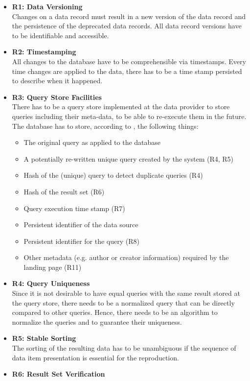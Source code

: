 \documentclass[draft,final]{vutinfth} %
\begin{document}
\begin{itemize}
	\item \textbf{R1: Data Versioning} \\
	Changes on a data record must result in a new version of the data record and the persistence of the deprecated data records. All data record versions have to be identifiable and accessible. 
	\item \textbf{R2: Timestamping} \\
	All changes to the database have to be comprehensible via timestamps. Every time changes are applied to the data, there has to be a time stamp persisted to describe when it happened. 
	\item \textbf{R3: Query Store Facilities} \\
	There has to be a query store implemented at the data provider to store queries including their meta-data, to be able to re-execute them in the future. The database has to store, according to \cite{rauber2016identification}, the following things: 
	\begin{itemize}
		\item The original query as applied to the database
		\item A potentially re-written unique query created by the system (R4, R5)
		\item Hash of the (unique) query to detect duplicate queries (R4)
		\item Hash of the result set (R6)
		\item Query execution time stamp (R7)
		\item Persistent identifier of the data source
		\item Persistent identifier for the query (R8)
		\item Other metadata (e.g. author or creator information) required by the landing page (R11)
	\end{itemize}
	\item \textbf{R4: Query Uniqueness} \\
	Since it is not desirable to have equal queries with the same result stored at the query store, there needs to be a normalized query that can be directly compared to other queries. Hence, there needs to be an algorithm to normalize the queries and to guarantee their uniqueness.
	\item \textbf{R5: Stable Sorting} \\
	The sorting of the resulting data has to be unambiguous if the sequence of data item presentation is essential for the reproduction.
	\item \textbf{R6: Result Set Verification} \\

\end{itemize}
\end{document}
